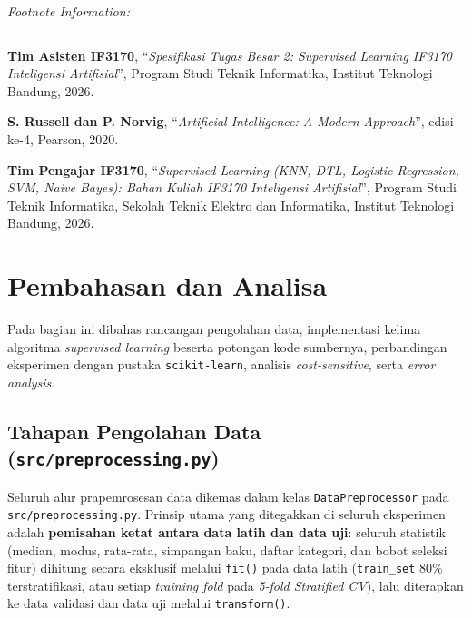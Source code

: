 \documentclass[11pt,a4paper]{article}
\numberwithin{figure}{section}
\numberwithin{table}{section}
\newenvironment{footnoteinfo}{%
  \par\vspace{12pt}%
  {\noindent\itshape\fontsize{10}{12}\selectfont Footnote Information:\par}%
  \vspace{2pt}%
  {\noindent\color{rulegray}\rule{0.45\textwidth}{0.4pt}\par}%
  \vspace{4pt}%
  \begingroup\fontsize{8.5}{11}\selectfont%
  \begin{enumerate}[leftmargin=*, label={[\arabic*]}, align=left, itemsep=2pt, topsep=4pt]%
}{%
  \end{enumerate}\endgroup\par%
}
\begin{document}
\begin{footnoteinfo}
  \item \textbf{Tim Asisten IF3170}, ``\textit{Spesifikasi Tugas Besar 2: Supervised Learning IF3170 Inteligensi Artifisial}'', Program Studi Teknik Informatika, Institut Teknologi Bandung, 2026.
  \item \textbf{S. Russell dan P. Norvig}, ``\textit{Artificial Intelligence: A Modern Approach}'', edisi ke-4, Pearson, 2020.
  \item \textbf{Tim Pengajar IF3170}, ``\textit{Supervised Learning (KNN, DTL, Logistic Regression, SVM, Naive Bayes): Bahan Kuliah IF3170 Inteligensi Artifisial}'', Program Studi Teknik Informatika, Sekolah Teknik Elektro dan Informatika, Institut Teknologi Bandung, 2026.
\end{footnoteinfo}

\clearpage
\section{Pembahasan dan Analisa}

Pada bagian ini dibahas rancangan pengolahan data, implementasi kelima algoritma \textit{supervised learning} beserta potongan kode sumbernya, perbandingan eksperimen dengan pustaka \texttt{scikit-learn}, analisis \textit{cost-sensitive}, serta \textit{error analysis}.

\subsection[Tahapan Pengolahan Data]{Tahapan Pengolahan Data (\texttt{src/preprocessing.py})}

Seluruh alur prapemrosesan data dikemas dalam kelas \texttt{DataPreprocessor} pada \texttt{src/preprocessing.py}. Prinsip utama yang ditegakkan di seluruh eksperimen adalah \textbf{pemisahan ketat antara data latih dan data uji}: seluruh statistik (median, modus, rata-rata, simpangan baku, daftar kategori, dan bobot seleksi fitur) dihitung secara eksklusif melalui \texttt{fit()} pada data latih (\texttt{train\_set} 80\% terstratifikasi, atau setiap \textit{training fold} pada \textit{5-fold Stratified CV}), lalu diterapkan ke data validasi dan data uji melalui \texttt{transform()}.
\end{document}
